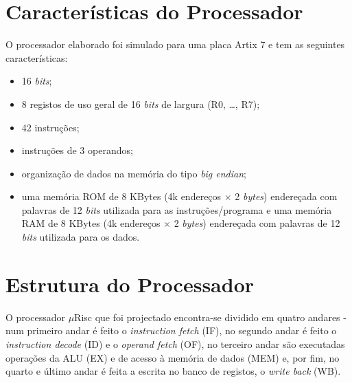 \documentclass[11pt]{article}
\numberwithin{equation}{section}
\begin{document}

\section{Características do Processador}

O processador elaborado foi simulado para uma placa Artix 7 e tem as seguintes características:

\vspace{-2mm}

\begin{itemize}
  \item 16 \textit{bits};
  \vspace{-2.5mm}
  \item 8 registos de uso geral de 16 \textit{bits} de largura (R0, \ldots, R7);
  \vspace{-2.5mm}
  \item 42 instruções;
  \vspace{-2.5mm}
  \item instruções de 3 operandos;
  \vspace{-2.5mm}
  \item organização de dados na memória do tipo \textit{big endian};
  \vspace{-2.5mm}
  \item uma memória ROM de 8 KBytes (4k endereços $\times$ 2 \textit{bytes}) endereçada com palavras de 12 \textit{bits} utilizada para as instruções/programa e uma memória RAM de 8 KBytes (4k endereços $\times$ 2 \textit{bytes}) endereçada com palavras de 12 \textit{bits} utilizada para os dados.
\end{itemize}

\section{Estrutura do Processador}

O processador $\mu$Risc que foi projectado encontra-se dividido em quatro andares - num primeiro andar é feito o \textit{instruction fetch} (IF), no segundo andar é feito o \textit{instruction decode} (ID) e o \textit{operand fetch} (OF), no terceiro andar são executadas operações da ALU (EX) e de acesso à memória de dados (MEM) e, por fim, no quarto e último andar é feita a escrita no banco de registos, o \textit{write back} (WB).

\end{document}
